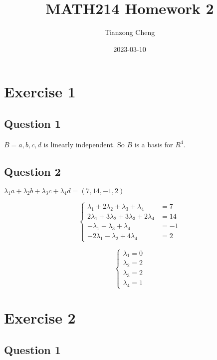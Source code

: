 \documentclass{article}
\title{MATH214 Homework 2}
\author{Tianzong Cheng}
\date{2023-03-10}
\begin{document}
\maketitle

\section{Exercise 1}

\subsection{Question 1}

$B={a,b,c,d}$ is linearly independent. So $B$ is a basis for $R^{4}$.

\subsection{Question 2}

$\lambda _{1}a+\lambda _{2}b+\lambda _{3}c+\lambda _{4}d=(7,14,-1,2)$

\begin{equation*}
    \left\{\begin{aligned}
        \lambda _{1}+2\lambda _{2}+\lambda _{3}+\lambda _{4}     & =7  \\
        2\lambda _{1}+3\lambda _{2} +3\lambda _{3}+2\lambda _{4} & =14 \\
        -\lambda _{1}-\lambda _{3}+ \lambda _{4}                 & =-1 \\
        -2\lambda _{1}-\lambda _{2}+4\lambda_{4}                 & =2
    \end{aligned}
    \right.
\end{equation*}

\begin{equation*}
    \left\{\begin{aligned}
        \lambda _{1}=0  \\
        \lambda _{2}=2  \\
        \lambda _{3} =2 \\
        \lambda _{4}=1
    \end{aligned}
    \right.
\end{equation*}

\section{Exercise 2}

\subsection{Question 1}
\end{document}
